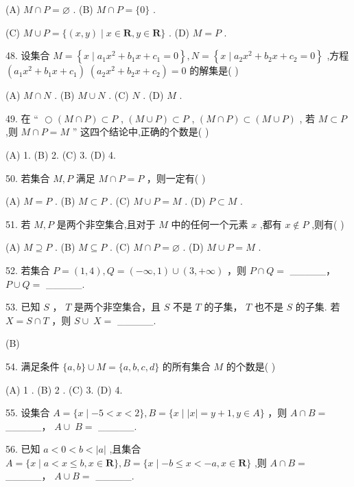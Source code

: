 \documentclass[10pt]{article}
\newcommand*\circled[1]{\tikz[baseline=(char.base)]{\node[shape=circle,draw,inner sep=1.5pt] (char) {\small #1};}}
\begin{document}
(A) \(M \cap  P = \varnothing\) . (B) \(M \cap  P = \{ 0\}\) .

(C) \(M \cup  P = \{ \left( {x,y}\right)  \mid  x \in  \mathbf{R},y \in  \mathbf{R}\}\) . (D) \(M = P\) .

48. 设集合 \(M = \left\{  {x \mid  {a}_{1}{x}^{2} + {b}_{1}x + {c}_{1} = 0}\right\}  ,N = \left\{  {x \mid  {a}_{2}{x}^{2} + {b}_{2}x + {c}_{2} = 0}\right\}\) ,方程 \(\left( {{a}_{1}{x}^{2} + {b}_{1}x + {c}_{1}}\right) \; \left( {{a}_{2}{x}^{2} + {b}_{2}x + {c}_{2}}\right)  = 0\) 的解集是( )

(A) \(M \cap  N\) . (B) \(M \cup  N\) . (C) \(N\) . (D) \(M\) .

49. 在 “ \(\text{ ○ } \left( {M \cap  P}\right)  \subset  P\) , \circled{2}  \(\left( {M \cup  P}\right)  \subset  P\) , \circled{3}  \(\left( {M \cap  P}\right)  \subset  \left( {M \cup  P}\right)\) , \circled{4} 若 \(M \subset  P\) ,则 \(M \cap  P = M\) ” 这四个结论中,正确的个数是( )

(A) 1. (B) 2. (C) 3. (D) 4.

50. 若集合 \(M,P\) 满足 \(M \cap  P = P\) ，则一定有( )

(A) \(M = P\) . (B) \(M \subset  P\) . (C) \(M \cup  P = M\) . (D) \(P \subset  M\) .

51. 若 \(M,P\) 是两个非空集合,且对于 \(M\) 中的任何一个元素 \(x\) ,都有 \(x \notin  P\) ,则有(   )

(A) \(M \supseteq  P\) . (B) \(M \subseteq  P\) . (C) \(M \cap  P = \varnothing\) . (D) \(M \cup  P = M\) .

52. 若集合 \(P = \left( {1,4}\right) ,Q = \left( {-\infty ,1}\right)  \cup  \left( {3, + \infty }\right)\) ，则 \(P \cap  Q =\) \_\_\_\_\_， \(P \cup  Q =\) \_\_\_\_\_.

53. 已知 \(S\) ， \(T\) 是两个非空集合，且 \(S\) 不是 \(T\) 的子集， \(T\) 也不是 \(S\) 的子集. 若 \(X = S \cap  T\) ，则 \(S \cup \; X =\) \_\_\_\_\_.

(B)

54. 满足条件 \(\{ a,b\}  \cup  M = \{ a,b,c,d\}\) 的所有集合 \(M\) 的个数是( )

(A) 1 . (B) 2 . (C) 3. (D) 4.

55. 设集合 \(A = \{ x \mid   - 5 < x < 2\} ,B = \{ x \mid  \left| x\right|  = y + 1,y \in  A\}\) ，则 \(A \cap  B =\) \_\_\_\_\_， \(A \cup \; B =\) \_\_\_\_\_.

56. 已知 \(a < 0 < b < \left| a\right|\) ,且集合 \(A = \{ x \mid  a < x \leq  b,x \in  \mathbf{R}\} ,B = \{ x \mid   - b \leq  x <  - a,x \in  \mathbf{R}\}\) ,则 \(A \cap  B =\) \_\_\_\_\_， \(A \cup  B =\) \_\_\_\_\_.
\end{document}
